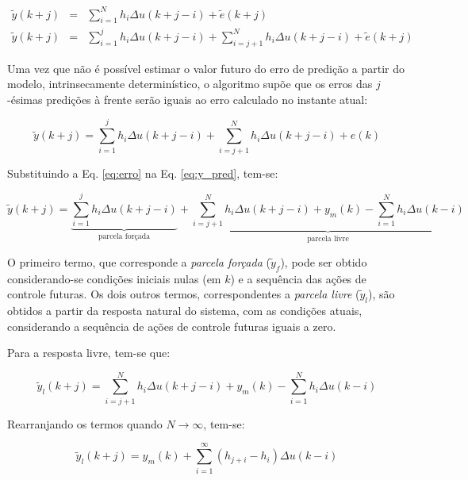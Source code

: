 \begin{eqnarray}
\tilde{y}(k+j) & = & \sum_{i=1}^N h_i\Delta u(k+j-i) + \tilde{e}(k+j)\nonumber\\
\tilde{y}(k+j) & = & \sum_{i=1}^j h_i\Delta u(k+j-i) +
                     \sum_{i=j+1}^N h_i\Delta u(k+j-i) + \tilde{e}(k+j)\nonumber
\end{eqnarray}

Uma vez que não é possível estimar o valor futuro do erro de predição a partir
do modelo, intrinsecamente determinístico, o algoritmo supõe que os erros das
$j$-ésimas predições à frente serão iguais ao erro calculado no instante atual:

\begin{equation}\label{eq:y_pred}
\tilde{y}(k+j) = \sum_{i=1}^j h_i\Delta u(k+j-i) +
                 \sum_{i=j+1}^N h_i\Delta u(k+j-i) + e(k)
\end{equation}

Substituindo a Eq. \ref{eq:erro} na Eq. \ref{eq:y_pred}, tem-se:

\begin{equation}\label{eq:dmc}
\tilde{y}(k+j) = \underbrace{\sum_{i=1}^j h_i\Delta u(k+j-i)}_
                 {\text{parcela forçada}} +
                 \underbrace{\sum_{i=j+1}^N h_i\Delta u(k+j-i) +
                             y_m(k) - \sum_{i=1}^N h_i\Delta u(k-i)}_
                 {\text{parcela livre}}
\end{equation}

O primeiro termo, que corresponde a {\it parcela forçada} ($\tilde{y}_f$), pode
ser obtido considerando-se condições iniciais nulas (em $k$) e a sequência das
ações de controle futuras. Os dois outros termos, correspondentes a {\it parcela
livre} ($\tilde{y}_l$), são obtidos a partir da resposta natural do sistema, com
as condições atuais, considerando a sequência de ações de controle futuras
iguais a zero.

Para a resposta livre, tem-se que:

\begin{equation*}
\tilde{y}_l(k+j) = \sum_{i=j+1}^N h_i\Delta u(k+j-i) + y_m(k) - 
                   \sum_{i=1}^N h_i\Delta u(k-i)
\end{equation*}

Rearranjando os termos quando $N \rightarrow \infty$, tem-se:

\begin{equation}\label{eq:resp_livre}
\tilde{y}_l(k+j) = y_m(k) + \sum_{i=1}^\infty (h_{j+i}-h_i)\Delta u(k-i)
\end{equation}

